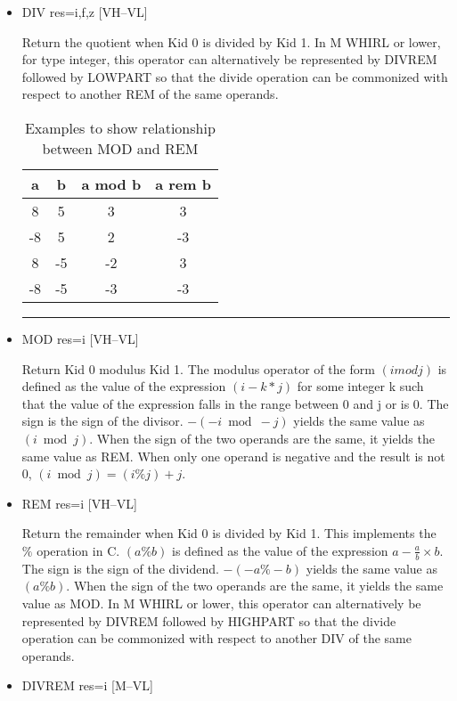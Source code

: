 \documentclass{article}
\begin{document}
\begin{itemize}
\item  DIV res=i,f,z \hfill [VH--VL]

Return the quotient when Kid 0 is divided by Kid 1. In M WHIRL
or lower, for type integer, this operator can alternatively be
represented by
DIVREM followed by LOWPART so that the divide operation can be
commonized with respect to another
REM of the same operands.



\begin{table}
\begin{center}
\begin{tabular}{|c|c||c|c|}
\hline
a & b & a mod b & a rem b \\\hline\hline
8 &5 &3 &3 \\\hline
-8 &5 &2 &-3\\\hline
8 &-5 &-2 &3\\ \hline
-8 &-5 &-3 &-3\\
\hline
\end{tabular}
\end{center}
\hrule
\caption{Examples to show relationship between MOD and REM}
\end{table}

\item  MOD res=i \hfill [VH--VL]

Return Kid 0 modulus Kid 1. The modulus operator of the form $(i
mod j)$ is defined as the value of the expression $(i - k * j)$ for
some integer k such
that the value of the expression falls in the range between 0 and
j or is 0. The sign is the sign of the divisor. $-(-i \bmod -j)$ yields
the same value as $(i \bmod j)$. When the sign of the two operands are
the same, it yields the same value as
REM. When only one operand is negative and the result is not 0, $(i
\bmod j) = (i \% j) + j$.

\item  REM res=i \hfill [VH--VL]

Return the remainder when Kid 0 is divided by Kid 1. This implements the
$\%$ operation in C. $(a \% b)$ is defined as the value of the expression $a - \frac{a}{b}\times b$. The sign is the sign of the dividend. $-(-a \% -b)$ yields
the same value as $(a \% b)$. When the sign of the two operands are
the same, it yields the same value as
MOD. In M WHIRL or lower, this operator can alternatively be
represented by
DIVREM followed by HIGHPART so that the divide operation can be
commonized with respect to another
DIV of the same operands.

\item  DIVREM res=i \hfill [M--VL]


\end{itemize}
\end{document}
